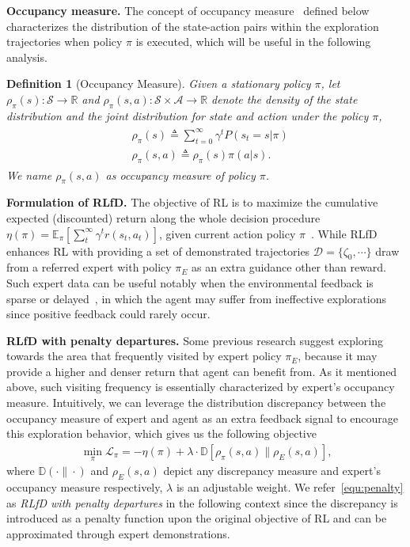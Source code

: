\documentclass[letterpaper]{article} %
\newtheorem{definition}{Definition}
\begin{document}
\noindent
\textbf{Occupancy measure.} The concept of occupancy measure~\cite{mdp_book,irl_lp} defined below characterizes the distribution of the state-action pairs within the exploration trajectories when policy $\pi$ is executed, which will be useful in the following analysis.
\begin{definition}[Occupancy Measure]\label{def:rho_sa}
Given a stationary policy $\pi$, let $\rho_\pi(s): \mathcal{S} \rightarrow \mathbb{R}$ and $\rho_\pi(s, a): \mathcal{S}\times\mathcal{A} \rightarrow \mathbb{R}$ denote the density of the state distribution and the joint distribution for state and action under the policy $\pi$,
\begin{align}\label{equ:rho_s}
\begin{split}
    &\rho_\pi(s)  \triangleq \sum_{t=0}^{\infty}\gamma^t P(s_t=s|\pi) \\
    &\rho_\pi(s,a) \triangleq \rho_\pi(s)\pi(a|s)\text{.}
\end{split}
\end{align}
We name $\rho_\pi(s,a)$ as occupancy measure of policy $\pi$.
\end{definition}
\noindent
\textbf{Formulation of RLfD.} The objective of RL is to maximize the cumulative expected (discounted) return along the whole decision procedure $\eta(\pi) = \mathbb{E}_\pi[\sum_t^\infty \gamma^tr(s_t, a_t)]$, given current action policy $\pi$~\cite{rl_book}. While RLfD enhances RL with providing a set of demonstrated trajectories $\mathcal{D} = \{\zeta_0, \cdots\}$ draw from a referred expert with policy $\pi_E$ as an extra guidance other than reward. Such expert data can be useful notably when the environmental feedback is sparse or delayed~\cite{ICM}, in which the agent may suffer from ineffective explorations since positive feedback could rarely occur.

\noindent
\textbf{RLfD with penalty departures.} Some previous research\cite{ijcaipofd1,pofd} suggest exploring towards the area that frequently visited by expert policy $\pi_E$, because it may provide a higher and denser return that agent can benefit from. As it mentioned above, such visiting frequency is essentially characterized by expert's occupancy measure. Intuitively, we can leverage the distribution discrepancy between the occupancy measure of expert and agent as an extra feedback signal to encourage this exploration behavior, which gives us the following objective
\begin{align}\label{equ:penalty}
    \min_\pi \mathcal{L}_\pi = -\eta(\pi) + \lambda\cdot \mathbb{D}\left[\rho_\pi(s,a) \| \rho_E(s,a)\right]\text{,}
\end{align}
where $\mathbb{D}(\cdot\|\cdot)$ and $\rho_E(s,a)$ depict any discrepancy measure and expert's occupancy measure respectively, $\lambda$ is an adjustable weight. We refer~\eqref{equ:penalty} as \emph{RLfD with penalty departures} in the following context since the discrepancy is introduced as a penalty function upon the original objective of RL and can be approximated through expert demonstrations.
\end{document}
